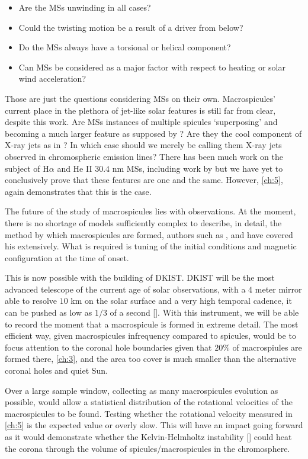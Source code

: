 \begin{itemize}
	\item{Are the MSs unwinding in all cases?}
	\item{Could the twisting motion be a result of a driver from below?}
	\item{Do the MSs always have a torsional or helical component?}
	\item{Can MSs be considered as a major factor with respect to heating or solar wind acceleration?}
\end{itemize}
 
 
Those are just the questions considering MSs on their own.
Macrospicules' current place in the plethora of jet-like solar features is still far from clear, despite this work.
Are MSs instances of multiple spicules `superposing' and becoming a much larger feature as supposed by \cite{Xia2005}?
Are they the cool component of X-ray jets as in \cite{Parenti2002}? In which case should we merely be calling them X-ray jets observed in chromospheric emission lines?
There has been much work on the subject of H$\alpha$ and He II $30.4$ nm MSs, including work by \cite{LaBonte79,Wang1998} but we have yet to conclusively prove that these features are one and the same.
However, \cref{ch:5}, again demonstrates that this is the case.
 
The future of the study of macrospicules lies with observations.
At the moment, there is no shortage of models sufficiently complex to describe, in detail, the method by which macrospicules are formed, authors such as \cite{Murawski2011}, \cite{Archontis2005} and \cite{Moreno2008} have covered his extensively.
What is required is tuning of the initial conditions and magnetic configuration at the time of onset.

This is now possible with the building of DKIST.
DKIST will be the most advanced telescope of the current age of solar observations, with a 4 meter mirror able to resolve $10$ km on the solar surface and a very high temporal cadence, it can be pushed as low as $1/3$ of a second [\cite{Woeger2016}].
With this instrument, we will be able to record the moment that a macrospicule is formed in extreme detail.
The most efficient way, given macrospicules infrequency compared to spicules, would be to focus attention to the coronal hole boundaries given that $20\%$ of macrospiules are formed there, \cref{ch:3}, and the area too cover is much smaller than the alternative coronal holes and quiet Sun.

Over a large sample window, collecting as many macrospicules evolution as possible, would allow a statistical distribution of the rotational velocities of the macrospicules to be found.
Testing whether the rotational velocity measured in \cref{ch:5} is the expected value or overly slow.
This will have an impact going forward as it would demonstrate whether the Kelvin-Helmholtz instability [\cite{Zaqarashvili2014}] could heat the corona through the volume of spicules/macrospicules in the chromosphere. 

